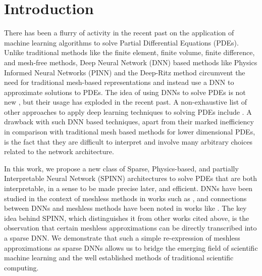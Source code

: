 \documentclass[12pt]{article}
\newcommand{\rR}[1]{#1}
\begin{document}
\section{Introduction}
There has been a flurry of activity in the recent past on the application of machine learning algorithms to solve Partial Differential Equations (PDEs). Unlike traditional methods like the finite element, finite volume, finite difference, and mesh-free methods, Deep Neural Network (DNN) based methods like Physics Informed Neural Networks (PINN) \cite{RPK2019} and the Deep-Ritz method \cite{EYu2018} circumvent the need for traditional mesh-based representations and instead use a DNN to approximate solutions to PDEs. The idea of using DNNs to solve PDEs is not new \cite{LLF97, LLP2000}, but their usage has exploded in the recent past. A non-exhaustive list of other approaches to apply deep learning techniques to solving PDEs include \cite{BN2018, SiKo2018, HJE2018, LLMXD2018, SAGNGHZR2020, WZ2020, LCX2020, CCLL2020, WXZZ2020pre, DS2020, lu2021deepxde, LTPGC2021}. A drawback with such DNN based techniques, apart from their marked inefficiency in comparison with traditional mesh based methods for lower dimensional PDEs, is the fact that they are difficult to interpret and involve many arbitrary choices related to the network architecture.

In this work, we propose a new class of Sparse, Physics-based, and \rR{partially} Interpretable Neural Network (SPINN) architectures to solve PDEs that are both interpretable\rR{, in a sense to be made precise later,} and efficient. DNNs have been studied in the context of meshless methods in works such as \cite{HHM2020, WZ2020}, and connections between DNNs and meshless methods have been noted in works like \cite{EMW20, CGPPT20}. The key idea behind SPINN, which distinguishes it from other works cited above, is the observation that certain meshless approximations can be directly transcribed into a sparse DNN. We demonstrate that such a simple re-expression of meshless approximations as sparse DNNs allows us to bridge the emerging field of scientific machine learning and the well established methods of traditional scientific computing.
\end{document}
